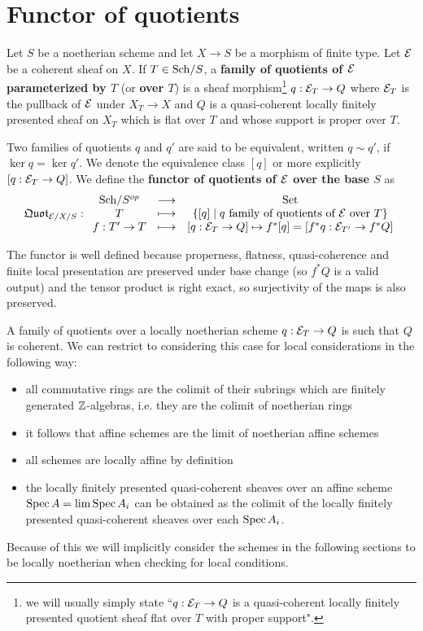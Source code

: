 \section{Functor of quotients}
\begin{definition}
Let $S$ be a noetherian scheme and let $X\to S$ be a morphism of finite type. Let $\mathcal{E}$ be a coherent sheaf on $X$. If $T\in {\mathrm{Sch}}/{S}$, a \textbf{family of quotients of $\mathcal{E}$ parameterized by $T$} (or \textbf{over $T$}) is a sheaf morphism\footnote{we will usually simply state ``$q:\mathcal{E}_T\to Q$ is a quasi-coherent locally finitely presented quotient sheaf flat over $T$ with proper support".} $q:\mathcal{E}_T\to Q$ where $\mathcal{E}_T$ is the pullback of $\mathcal{E}$ under $X_T\to X$ and $Q$ is a quasi-coherent locally finitely presented sheaf on $X_T$ which is flat over $T$ and whose support is proper over $T$.

Two families of quotients $q$ and $q'$ are said to be equivalent, written $q\sim q'$, if $\ker q=\ker q'$. We denote the equivalence class $[q]$ or more explicitly $[q:\mathcal{E}_T\to Q]$. We define the \textbf{functor of quotients of $\mathcal{E}$ over the base $S$} as
\[\mathfrak{Quot}_{\mathcal{E}/X/S}:\begin{array}{ccc} {{\mathrm{Sch}}/{S}^{op}} & \longrightarrow & {\mathrm{Set}}\\ {T} & \longmapsto & {\left\{{[q]\mid q\text{ family of quotients of $\mathcal{E}$ over $T$}}\right\}}\\ {f:T'\to T} & \longmapsto & {[q:\mathcal{E}_T\to Q]\mapsto f^\ast[q]=[f^\ast q:\mathcal{E}_{T'}\to f^\ast Q]} \end{array}\]
\end{definition}

\begin{remark}
The functor is well defined because properness, flatness, quasi-coherence and finite local presentation are preserved under base change (so $f^\ast Q$ is a valid output) and the tensor product is right exact, so surjectivity of the maps is also preserved.
\end{remark}

\begin{remark}
A family of quotients over a locally noetherian scheme $q:\mathcal{E}_T\to Q$ is such that $Q$ is coherent. We can restrict to considering this case for local considerations in the following way:
\begin{itemize}
\item all commutative rings are the colimit of their subrings which are finitely generated $\mathbb{Z}$-algebras, i.e. they are the colimit of noetherian rings
\item it follows that affine schemes are the limit of noetherian affine schemes
\item all schemes are locally affine by definition
\item the locally finitely presented quasi-coherent sheaves over an affine scheme $\mathrm{Spec}\, A=\lim \mathrm{Spec}\, A_i$ can be obtained as the colimit of the locally finitely presented quasi-coherent sheaves over each $\mathrm{Spec}\, A_i$.
\end{itemize}
Because of this we will implicitly consider the schemes in the following sections to be locally noetherian when checking for local conditions.
\end{remark}


